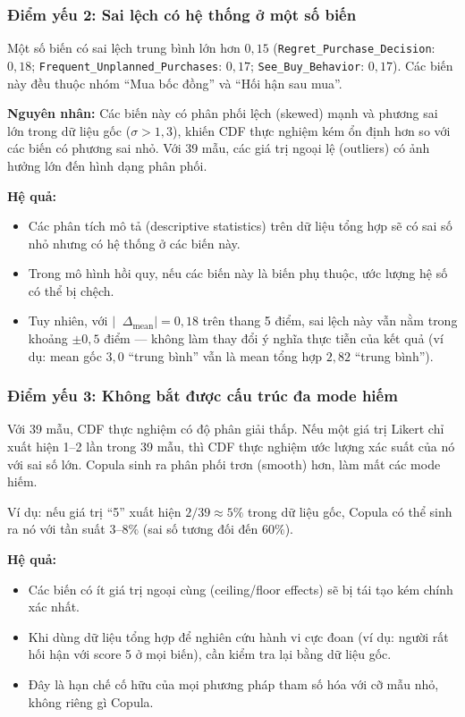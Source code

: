 \documentclass[12pt,a4paper]{article}
\newcommand{\diff}{\mathop{}\!\Delta}
\newcommand{\abs}[1]{\lvert #1 \rvert}
\begin{document}
\subsubsection{Điểm yếu 2: Sai lệch có hệ thống ở một số biến}

Một số biến có sai lệch trung bình lớn hơn $0{,}15$ 
(\texttt{Regret\_Purchase\_Decision}: $0{,}18$; 
\texttt{Frequent\_Unplanned\_Purchases}: $0{,}17$; 
\texttt{See\_Buy\_Behavior}: $0{,}17$). 
Các biến này đều thuộc nhóm ``Mua bốc đồng'' và ``Hối hận sau mua''.

\textbf{Nguyên nhân:} 
Các biến này có phân phối lệch (skewed) mạnh và 
phương sai lớn trong dữ liệu gốc ($\sigma > 1{,}3$), 
khiến CDF thực nghiệm kém ổn định hơn so với các biến 
có phương sai nhỏ. Với 39 mẫu, 
các giá trị ngoại lệ (outliers) có ảnh hưởng lớn đến 
hình dạng phân phối.

\textbf{Hệ quả:}
\begin{itemize}
    \item Các phân tích mô tả (descriptive statistics) trên dữ liệu tổng hợp 
    sẽ có sai số nhỏ nhưng có hệ thống ở các biến này.
    \item Trong mô hình hồi quy, nếu các biến này là biến phụ thuộc,
    ước lượng hệ số có thể bị chệch.
    \item Tuy nhiên, với $\abs{\diff_{\text{mean}}} = 0{,}18$ trên thang 5 điểm, 
    sai lệch này vẫn nằm trong khoảng $\pm 0{,}5$ điểm — 
    không làm thay đổi ý nghĩa thực tiễn của kết quả 
    (ví dụ: mean gốc $3{,}0$ ``trung bình'' vẫn là mean tổng hợp $2{,}82$ ``trung bình'').
\end{itemize}

\subsubsection{Điểm yếu 3: Không bắt được cấu trúc đa mode hiếm}

Với 39 mẫu, CDF thực nghiệm có độ phân giải thấp. 
Nếu một giá trị Likert chỉ xuất hiện 1--2 lần trong 39 mẫu, 
thì CDF thực nghiệm ước lượng xác suất của nó với sai số lớn. 
Copula sinh ra phân phối trơn (smooth) hơn, 
làm mất các mode hiếm.

Ví dụ: nếu giá trị ``5'' xuất hiện $2/39 \approx 5\%$ trong dữ liệu gốc, 
Copula có thể sinh ra nó với tần suất $3$--$8\%$ 
(sai số tương đối đến $60\%$).

\textbf{Hệ quả:}
\begin{itemize}
    \item Các biến có ít giá trị ngoại cùng (ceiling/floor effects) 
    sẽ bị tái tạo kém chính xác nhất.
    \item Khi dùng dữ liệu tổng hợp để nghiên cứu 
    hành vi cực đoan (ví dụ: người rất hối hận với score 5 ở mọi biến), 
    cần kiểm tra lại bằng dữ liệu gốc.
    \item Đây là hạn chế cố hữu của mọi phương pháp tham số hóa 
    với cỡ mẫu nhỏ, không riêng gì Copula.
\end{itemize}
\end{document}
